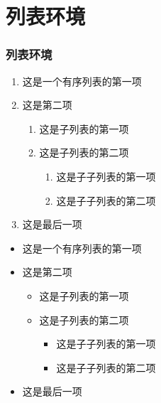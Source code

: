 \documentclass[10pt]{beamer}
\begin{document}
\section{列表环境}
\begin{frame}
\frametitle{列表环境}
\begin{enumerate}
  \item 这是一个有序列表的第一项
  \item 这是第二项
  \begin{enumerate}
    \item 这是子列表的第一项
    \item 这是子列表的第二项
    \begin{enumerate}
      \item 这是子子列表的第一项
      \item 这是子子列表的第二项
    \end{enumerate}
  \end{enumerate}
  \item 这是最后一项
\end{enumerate}

\begin{itemize}
  \item 这是一个有序列表的第一项
  \item 这是第二项
  \begin{itemize}
    \item 这是子列表的第一项
    \item 这是子列表的第二项
    \begin{itemize}
      \item 这是子子列表的第一项
      \item 这是子子列表的第二项
    \end{itemize}
  \end{itemize}
  \item 这是最后一项
\end{itemize}

\end{frame}

\end{document}
